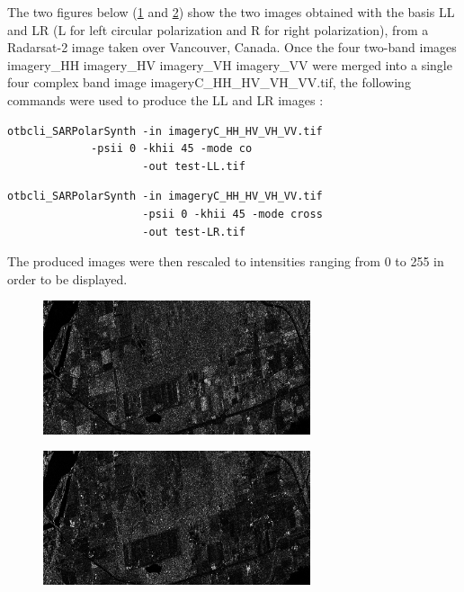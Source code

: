 The two figures below (\ref{fig:polsynthll} and \ref{fig:polsynthlr}) show the
two images obtained with the basis LL and LR (L for left circular polarization
and R for right polarization), from a Radarsat-2 image taken over
Vancouver, Canada. Once the four two-band images imagery\_HH imagery\_HV imagery\_VH
imagery\_VV were merged into a single four complex band image
imageryC\_HH\_HV\_VH\_VV.tif, the following commands were used to produce the LL
and LR images :

\begin{verbatim} 
otbcli_SARPolarSynth -in imageryC_HH_HV_VH_VV.tif 
		     -psii 0 -khii 45 -mode co 
                     -out test-LL.tif 
\end{verbatim}
\begin{verbatim} 
otbcli_SARPolarSynth -in imageryC_HH_HV_VH_VV.tif
                     -psii 0 -khii 45 -mode cross 
                     -out test-LR.tif 
\end{verbatim}

The produced images were then rescaled to intensities ranging from 0 to 255 in
order to be displayed.

\begin{figure}[!h]
\center
\includegraphics[width=0.7\textwidth]{../Art/test-left-co-2.png}
\label{fig:polsynthll}
\end{figure}

\begin{figure}[!h]
\center
\includegraphics[width=0.7\textwidth]{../Art/test-left-cross-2.png}
\label{fig:polsynthlr}
\end{figure}

